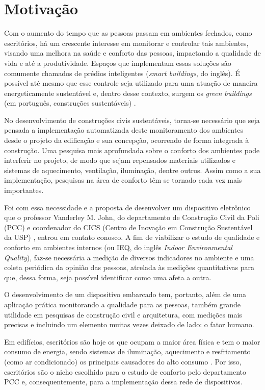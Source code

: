 \documentclass[../monografia.tex]{subfiles}
\begin{document}
\section{Motivação}

Com o aumento do tempo que as pessoas passam em ambientes fechados, como escritórios, há um crescente interesse em monitorar e controlar tais ambientes, visando uma melhora na saúde e conforto das pessoas, impactando a qualidade de vida e até a produtividade. Espaços que implementam essas soluções são comumente chamados de prédios inteligentes (\textit{smart buildings}, do inglês). É possível até mesmo que esse controle seja utilizado para uma atuação de maneira energeticamente sustentável e, dentro desse contexto, surgem os \textit{green buildings} (em português, construções sustentáveis) \cite{GreenBuildings} \cite{EnergyBuildings}.

No desenvolvimento de construções civis sustentáveis, torna-se necessário que seja pensada a implementação automatizada deste monitoramento dos ambientes desde o projeto da edificação e sua concepção, ocorrendo de forma integrada à construção. Uma pesquisa mais aprofundada sobre o conforto dos ambientes pode interferir no projeto, de modo que sejam repensados materiais utilizados e sistemas de aquecimento, ventilação, iluminação, dentre outros. Assim como a sua implementação, pesquisas na área de conforto têm se tornado cada vez mais importantes. 

Foi com essa necessidade e a proposta de desenvolver um dispositivo eletrônico que o professor Vanderley M. John, do departamento de Construção Civil da Poli (PCC) e coordenador do CICS (Centro de Inovação em Construção Sustentável da USP) \cite{CICS}, entrou em contato conosco. A fim de viabilizar o estudo de qualidade e conforto em ambientes internos (ou IEQ, do inglês \textit{Indoor Environmental Quality}), faz-se necessária a medição de diversos indicadores no ambiente e uma coleta periódica da opinião das pessoas, atrelada às medições quantitativas para que, dessa forma, seja possível identificar como uma afeta a outra. 

O desenvolvimento de um dispositivo embarcado tem, portanto, além de uma aplicação prática monitorando a qualidade para as pessoas, também grande utilidade em pesquisas de construção civil e arquitetura, com medições mais precisas e incluindo um elemento muitas vezes deixado de lado: o fator humano.

Em edifícios, escritórios são hoje os que ocupam a maior área física e tem o maior consumo de energia, sendo sistemas de iluminação, aquecimento e resfriamento (como ar condicionado) os principais causadores do alto consumo \cite{EnergyBuildings}. Por isso, escritórios são o nicho escolhido para o estudo de conforto pelo departamento PCC e, consequentemente, para a implementação dessa rede de dispositivos. 
\end{document}
